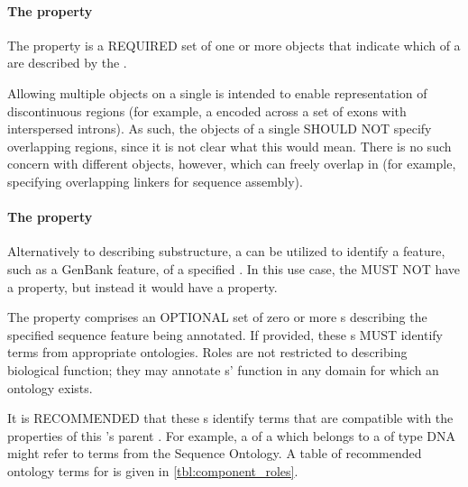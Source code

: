 \paragraph{The  property}\label{sec:locations}
The  property is a REQUIRED set of one or more  objects that indicate which  of a  are described by the .

Allowing multiple  objects on a single  is intended to enable representation of discontinuous regions (for example, a  encoded across a set of exons with interspersed introns).
As such, the  objects of a single  SHOULD NOT specify overlapping regions, since it is not clear what this would mean.
There is no such concern with different  objects, however, which can freely overlap in  (for example, specifying overlapping linkers for sequence assembly).


\paragraph{The  property}\label{sec:roles:SA}

Alternatively to describing substructure, a  can be utilized to identify a feature, such as a GenBank feature, of a specified .  In this use case, the  MUST NOT have a  property, but instead it would have a  property.  

The  property comprises an OPTIONAL set of zero or more s describing the specified sequence feature being annotated.  If provided, these  s MUST identify terms from appropriate ontologies. Roles are not restricted to describing biological function; they may annotate s' function in any domain for which an ontology exists.

It is RECOMMENDED that these  s identify terms that are compatible with the  properties of this 's parent . For example, a  of a  which belongs to a  of type DNA might refer to terms from the Sequence Ontology. A table of recommended ontology terms for  is given in \ref{tbl:component_roles}.



